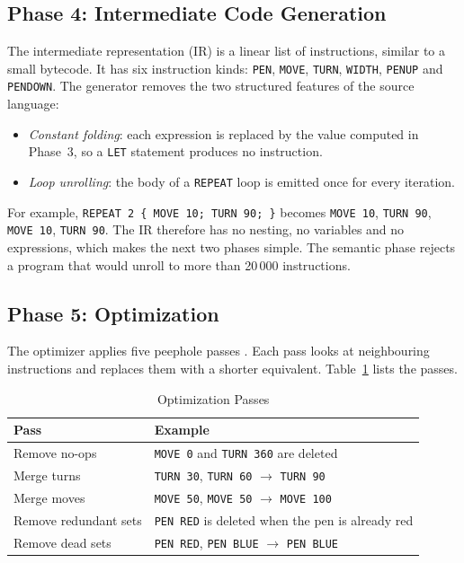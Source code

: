 \documentclass[conference]{IEEEtran}
\newcommand{\kw}[1]{\texttt{#1}}
\begin{document}
\subsection{Phase 4: Intermediate Code Generation}
The intermediate representation (IR) is a linear list of instructions, similar to a small bytecode. It has six instruction kinds: \kw{PEN}, \kw{MOVE}, \kw{TURN}, \kw{WIDTH}, \kw{PENUP} and \kw{PENDOWN}. The generator removes the two structured features of the source language:
\begin{itemize}
\item \textit{Constant folding}: each expression is replaced by the value computed in Phase~3, so a \kw{LET} statement produces no instruction.
\item \textit{Loop unrolling}: the body of a \kw{REPEAT} loop is emitted once for every iteration.
\end{itemize}
For example, \kw{REPEAT 2 \{ MOVE 10; TURN 90; \}} becomes \kw{MOVE 10}, \kw{TURN 90}, \kw{MOVE 10}, \kw{TURN 90}. The IR therefore has no nesting, no variables and no expressions, which makes the next two phases simple. The semantic phase rejects a program that would unroll to more than 20\,000 instructions.

\subsection{Phase 5: Optimization}
The optimizer applies five peephole passes \cite{cooper}. Each pass looks at neighbouring instructions and replaces them with a shorter equivalent. Table~\ref{tab:passes} lists the passes.

\begin{table}[htbp]
\caption{Optimization Passes}
\label{tab:passes}
\centering
\footnotesize
\begin{tabularx}{\columnwidth}{@{}l>{\raggedright\arraybackslash}X@{}}
\toprule
Pass & Example\\
\midrule
Remove no-ops & \kw{MOVE 0} and \kw{TURN 360} are deleted\\
Merge turns & \kw{TURN 30}, \kw{TURN 60} $\rightarrow$ \kw{TURN 90}\\
Merge moves & \kw{MOVE 50}, \kw{MOVE 50} $\rightarrow$ \kw{MOVE 100}\\
Remove redundant sets & \kw{PEN RED} is deleted when the pen is already red\\
Remove dead sets & \kw{PEN RED}, \kw{PEN BLUE} $\rightarrow$ \kw{PEN BLUE}\\
\bottomrule
\end{tabularx}
\end{table}
\end{document}
